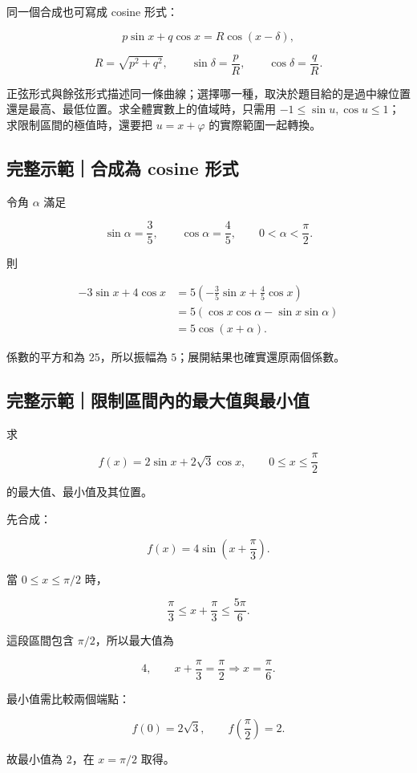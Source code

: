 \documentclass[11pt,a4paper]{article}
\begin{document}
同一個合成也可寫成 cosine 形式：

\[
\boxed{p\sin x+q\cos x=R\cos(x-\delta)},
\]

\[
R=\sqrt{p^2+q^2},
\qquad
\sin\delta=\frac pR,
\qquad
\cos\delta=\frac qR.
\]

正弦形式與餘弦形式描述同一條曲線；選擇哪一種，取決於題目給的是過中線位置還是最高、最低位置。求全體實數上的值域時，只需用 \(-1\le\sin u,\cos u\le1\)；求限制區間的極值時，還要把 \(u=x+\varphi\) 的實際範圍一起轉換。

\begin{HandoutWorkedExample}

\subsection{完整示範｜合成為 cosine 形式}\label{ux5b8cux6574ux793aux7bc4ux5408ux6210ux70ba-cosine-ux5f62ux5f0f}

令角 \(\alpha\) 滿足

\[
\sin\alpha=\frac35,
\qquad
\cos\alpha=\frac45,
\qquad 0<\alpha<\frac\pi2.
\]

則

\[
\begin{aligned}
-3\sin x+4\cos x
&=5\left(-\frac35\sin x+\frac45\cos x\right)\\
&=5(\cos x\cos\alpha-\sin x\sin\alpha)\\
&=\boxed{5\cos(x+\alpha)}.
\end{aligned}
\]

係數的平方和為 \(25\)，所以振幅為 \(5\)；展開結果也確實還原兩個係數。

\end{HandoutWorkedExample}

\begin{HandoutWorkedExample}

\subsection{完整示範｜限制區間內的最大值與最小值}\label{ux5b8cux6574ux793aux7bc4ux9650ux5236ux5340ux9593ux5167ux7684ux6700ux5927ux503cux8207ux6700ux5c0fux503c}

求

\[
f(x)=2\sin x+2\sqrt3\cos x,
\qquad 0\le x\le\frac\pi2
\]

的最大值、最小值及其位置。

先合成：

\[
f(x)=4\sin\left(x+\frac\pi3\right).
\]

當 \(0\le x\le\pi/2\) 時，

\[
\frac\pi3\le x+\frac\pi3\le\frac{5\pi}{6}.
\]

這段區間包含 \(\pi/2\)，所以最大值為

\[
\boxed{4},
\qquad x+\frac\pi3=\frac\pi2
\Longrightarrow x=\boxed{\frac\pi6}.
\]

最小值需比較兩個端點：

\[
f(0)=2\sqrt3,
\qquad
f\left(\frac\pi2\right)=2.
\]

故最小值為 \(\boxed{2}\)，在 \(x=\boxed{\pi/2}\) 取得。

\end{HandoutWorkedExample}
\end{document}
